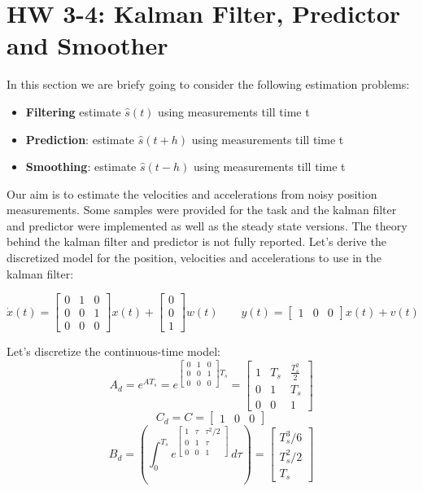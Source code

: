 \documentclass[a4paper,12pt]{article}
\begin{document}
\section{HW 3-4: Kalman Filter, Predictor and Smoother}
In this section we are briefy going to consider the following estimation problems:
\begin{itemize}
    \item \textbf{Filtering} estimate $\hat{s}(t)$ using measurements till time t
    \item \textbf{Prediction}: estimate $\hat{s}(t+h)$ using measurements till time t
    \item \textbf{Smoothing}: estimate $\hat{s}(t-h)$ using measurements till time t
\end{itemize}
\bigskip

Our aim is to estimate the velocities and accelerations from noisy position measurements. Some samples were provided for the task and the kalman filter and predictor were implemented as well as the steady state versions. The theory behind the kalman filter and predictor is not fully reported. Let's derive the discretized model for the position, velocities and accelerations to use in the kalman filter:

\begin{equation}
    \dot{x}(t) =  \begin{bmatrix}  0&1&0 \\ 0&0&1\\0&0&0 \end{bmatrix} x(t) + \begin{bmatrix}  0\\0\\1 \end{bmatrix} w(t)
    \qquad
    y(t) = \begin{bmatrix}  1&0&0 \end{bmatrix}x(t) + v(t)
\end{equation}

\noindent Let's discretize the continuous-time model:
\[
    A_d = e^{AT_s} = e^{\begin{bmatrix}  0&1&0 \\ 0&0&1\\0&0&0 \end{bmatrix}T_s} = \begin{bmatrix} 1&T_s&\frac{T_s^2}{2}\\0&1&T_s\\0&0&1 \end{bmatrix}
\]
\[
    C_d = C = \begin{bmatrix} 1&0&0 \end{bmatrix}
\]
\[
    B_d = \left (\int_{0}^{T_s} e^{\begin{bmatrix} 1&\tau&\tau^2/2\\0&1&\tau\\0&0&1 \end{bmatrix}} \,d\tau \right) = \begin{bmatrix} T_s^3/6\\T_s^2/2\\T_s \end{bmatrix}
\]
\end{document}
